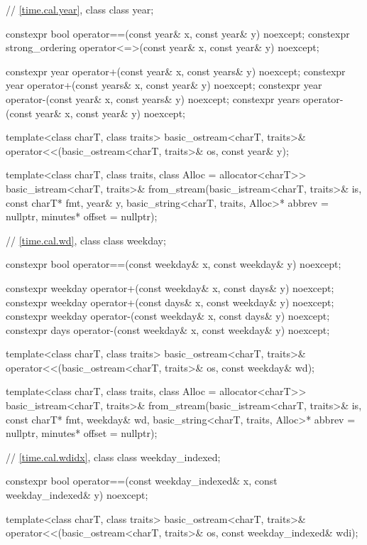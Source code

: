 \begin{codeblock}
{{    // \ref{time.cal.year}, class 
    class year;

    constexpr bool operator==(const year& x, const year& y) noexcept;
    constexpr strong_ordering operator<=>(const year& x, const year& y) noexcept;

    constexpr year  operator+(const year&  x, const years& y) noexcept;
    constexpr year  operator+(const years& x, const year&  y) noexcept;
    constexpr year  operator-(const year&  x, const years& y) noexcept;
    constexpr years operator-(const year&  x, const year&  y) noexcept;

    template<class charT, class traits>
      basic_ostream<charT, traits>&
        operator<<(basic_ostream<charT, traits>& os, const year& y);

    template<class charT, class traits, class Alloc = allocator<charT>>
      basic_istream<charT, traits>&
        from_stream(basic_istream<charT, traits>& is, const charT* fmt,
                    year& y, basic_string<charT, traits, Alloc>* abbrev = nullptr,
                    minutes* offset = nullptr);

    // \ref{time.cal.wd}, class 
    class weekday;

    constexpr bool operator==(const weekday& x, const weekday& y) noexcept;

    constexpr weekday operator+(const weekday& x, const days&    y) noexcept;
    constexpr weekday operator+(const days&    x, const weekday& y) noexcept;
    constexpr weekday operator-(const weekday& x, const days&    y) noexcept;
    constexpr days    operator-(const weekday& x, const weekday& y) noexcept;

    template<class charT, class traits>
      basic_ostream<charT, traits>&
        operator<<(basic_ostream<charT, traits>& os, const weekday& wd);

    template<class charT, class traits, class Alloc = allocator<charT>>
      basic_istream<charT, traits>&
        from_stream(basic_istream<charT, traits>& is, const charT* fmt,
                    weekday& wd, basic_string<charT, traits, Alloc>* abbrev = nullptr,
                    minutes* offset = nullptr);

    // \ref{time.cal.wdidx}, class 
    class weekday_indexed;

    constexpr bool operator==(const weekday_indexed& x, const weekday_indexed& y) noexcept;

    template<class charT, class traits>
      basic_ostream<charT, traits>&
        operator<<(basic_ostream<charT, traits>& os, const weekday_indexed& wdi);

}}
\end{codeblock}
